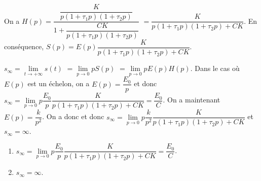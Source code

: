 \begin{corrigebox}
On a 
$H(p)=\dfrac{\dfrac{K}{p\left(1+\tau_1 p \right)\left(1+\tau_2 p \right)}}{1+\dfrac{CK}{p\left(1+\tau_1 p \right)\left(1+\tau_2 p \right)}}$
$=\dfrac{K}{p\left(1+\tau_1 p \right)\left(1+\tau_2 p \right)+CK}$. 
En conséquence, $S(p)=E(p)\dfrac{K}{p\left(1+\tau_1 p \right)\left(1+\tau_2 p \right)+CK}$.

$s_{\infty}=\lim\limits_{t\to +\infty} s(t)$ $=\lim\limits_{p\to 0} pS(p)$
$=\lim\limits_{p\to 0} pE(p)H(p)$.
Dans le cas où $E(p)$ est un échelon, on a $E(p)=\dfrac{E_0}{p}$ et donc 
$s_{\infty}=\lim\limits_{p\to 0} p\dfrac{E_0}{p}\dfrac{K}{p\left(1+\tau_1 p \right)\left(1+\tau_2 p \right)+CK}=\dfrac{E_0}{C}$.
On a maintenant $E(p)=\dfrac{k}{p^2}$. 
On a donc et donc 
$s_{\infty}=\lim\limits_{p\to 0} p\dfrac{k}{p^2}\dfrac{K}{p\left(1+\tau_1 p \right)\left(1+\tau_2 p \right)+CK}$ et 
$s_{\infty}=\infty$.

\begin{enumerate}
    \item $s_{\infty}=\lim\limits_{p\to 0} p\dfrac{E_0}{p}\dfrac{K}{p\left(1+\tau_1 p \right)\left(1+\tau_2 p \right)+CK}=\dfrac{E_0}{C}$.
   
    \item $s_{\infty}=\infty$.
   

\end{enumerate}
\end{corrigebox}
